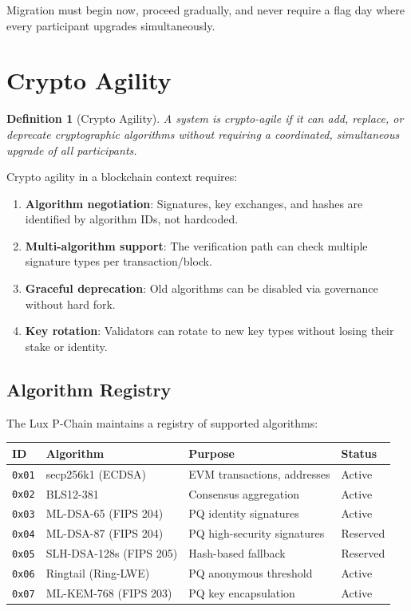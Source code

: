 \documentclass[11pt,a4paper]{article}
\newtheorem{definition}{Definition}[section]
\begin{document}
Migration must begin now, proceed gradually, and never require a flag day where every participant upgrades simultaneously.

\section{Crypto Agility}

\begin{definition}[Crypto Agility]
A system is \emph{crypto-agile} if it can add, replace, or deprecate cryptographic algorithms without requiring a coordinated, simultaneous upgrade of all participants.
\end{definition}

Crypto agility in a blockchain context requires:

\begin{enumerate}[leftmargin=2em]
\item \textbf{Algorithm negotiation}: Signatures, key exchanges, and hashes are identified by algorithm IDs, not hardcoded.
\item \textbf{Multi-algorithm support}: The verification path can check multiple signature types per transaction/block.
\item \textbf{Graceful deprecation}: Old algorithms can be disabled via governance without hard fork.
\item \textbf{Key rotation}: Validators can rotate to new key types without losing their stake or identity.
\end{enumerate}

\subsection{Algorithm Registry}

The Lux P-Chain maintains a registry of supported algorithms:

\begin{center}
\begin{tabular}{llll}
\toprule
\textbf{ID} & \textbf{Algorithm} & \textbf{Purpose} & \textbf{Status} \\
\midrule
\texttt{0x01} & secp256k1 (ECDSA) & EVM transactions, addresses & Active \\
\texttt{0x02} & BLS12-381 & Consensus aggregation & Active \\
\texttt{0x03} & ML-DSA-65 (FIPS 204) & PQ identity signatures & Active \\
\texttt{0x04} & ML-DSA-87 (FIPS 204) & PQ high-security signatures & Reserved \\
\texttt{0x05} & SLH-DSA-128s (FIPS 205) & Hash-based fallback & Reserved \\
\texttt{0x06} & Ringtail (Ring-LWE) & PQ anonymous threshold & Active \\
\texttt{0x07} & ML-KEM-768 (FIPS 203) & PQ key encapsulation & Active \\
\bottomrule
\end{tabular}
\end{center}
\end{document}
